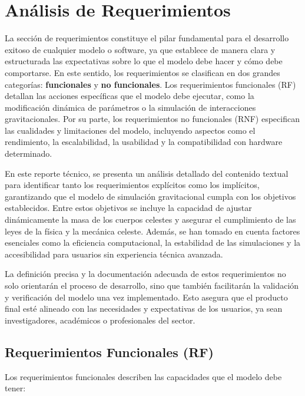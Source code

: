 \section{Análisis de Requerimientos}

La sección de requerimientos constituye el pilar fundamental para el desarrollo exitoso de cualquier modelo o software, ya que establece de manera clara y estructurada las expectativas sobre lo que el modelo debe hacer y cómo debe comportarse. En este sentido, los requerimientos se clasifican en dos grandes categorías: \textbf{funcionales} y \textbf{no funcionales}. Los requerimientos funcionales (RF) detallan las acciones específicas que el modelo debe ejecutar, como la modificación dinámica de parámetros o la simulación de interacciones gravitacionales. Por su parte, los requerimientos no funcionales (RNF) especifican las cualidades y limitaciones del modelo, incluyendo aspectos como el rendimiento, la escalabilidad, la usabilidad y la compatibilidad con hardware determinado.

En este reporte técnico, se presenta un análisis detallado del contenido textual para identificar tanto los requerimientos explícitos como los implícitos, garantizando que el modelo de simulación gravitacional cumpla con los objetivos establecidos. Entre estos objetivos se incluye la capacidad de ajustar dinámicamente la masa de los cuerpos celestes y asegurar el cumplimiento de las leyes de la física y la mecánica celeste. Además, se han tomado en cuenta factores esenciales como la eficiencia computacional, la estabilidad de las simulaciones y la accesibilidad para usuarios sin experiencia técnica avanzada.

La definición precisa y la documentación adecuada de estos requerimientos no solo orientarán el proceso de desarrollo, sino que también facilitarán la validación y verificación del modelo una vez implementado. Esto asegura que el producto final esté alineado con las necesidades y expectativas de los usuarios, ya sean investigadores, académicos o profesionales del sector.

\newpage
\subsection{Requerimientos Funcionales (RF)}

Los requerimientos funcionales describen las capacidades que el modelo debe tener:

